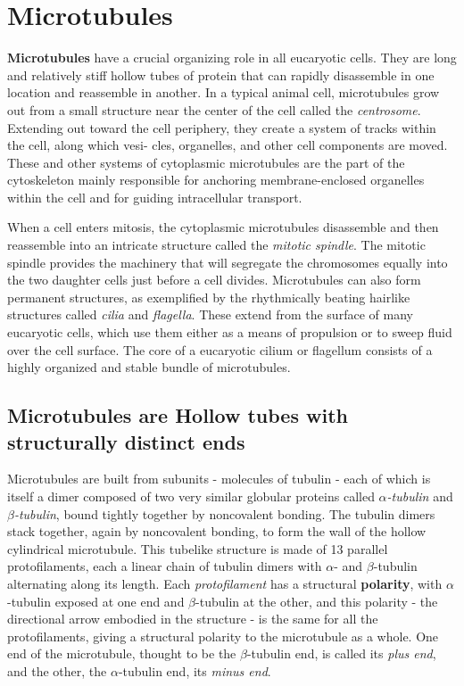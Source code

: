 \section{Microtubules}

\textbf{Microtubules} have a crucial organizing role in all eucaryotic cells. They
are long and relatively stiff hollow tubes of protein that can rapidly disassemble
in one location and reassemble in another. In a typical animal
cell, microtubules grow out from a small structure near the center of the
cell called the \textit{centrosome}. Extending out toward the cell
periphery, they create a system of tracks within the cell, along which vesi-
cles, organelles, and other cell components are moved. These and other
systems of cytoplasmic microtubules are the part of the cytoskeleton
mainly responsible for anchoring membrane-enclosed organelles within
the cell and for guiding intracellular transport.

When a cell enters mitosis, the cytoplasmic microtubules disassemble
and then reassemble into an intricate structure called the \textit{mitotic spindle}.
The mitotic spindle provides the machinery that will segregate the chromosomes equally
into the two daughter cells just before a cell divides. Microtubules can also form
permanent structures, as exemplified by the rhythmically beating hairlike
structures called \textit{cilia} and \textit{flagella}. These extend from the
surface of many eucaryotic cells, which use them either as a means of
propulsion or to sweep fluid over the cell surface. The core of a eucaryotic
cilium or flagellum consists of a highly organized and stable bundle of
microtubules.

\subsection{Microtubules are Hollow tubes with structurally distinct ends}

Microtubules are built from subunits - molecules of tubulin - each of
which is itself a dimer composed of two very similar globular proteins
called \textit{$\alpha$-tubulin} and \textit{$\beta$-tubulin}, bound tightly together by noncovalent
bonding. The tubulin dimers stack together, again by noncovalent bonding,
to form the wall of the hollow cylindrical microtubule. This tubelike
structure is made of 13 parallel protofilaments, each a linear chain of tubulin
dimers with $\alpha$- and $\beta$-tubulin alternating along its length.
Each \textit{protofilament} has a structural \textbf{polarity}, with $\alpha$-tubulin exposed at
one end and $\beta$-tubulin at the other, and this polarity - the directional
arrow embodied in the structure - is the same for all the protofilaments,
giving a structural polarity to the microtubule as a whole. One end of the
microtubule, thought to be the $\beta$-tubulin end, is called its \textit{plus end}, and
the other, the $\alpha$-tubulin end, its \textit{minus end}.

